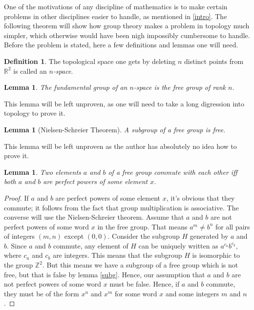 \documentclass[12pt, titlepage]{article}
\newtheorem{lem}[thm]{Lemma}
\theoremstyle{definition}
\newtheorem{defn}{Definition}[section]
\begin{document}
One of the motivations of any discipline of mathematics is to make certain problems in other disciplines easier to handle, as mentioned in \autoref{intro}. The following theorem will show how group theory makes a problem in topology much simpler, which otherwise would have been nigh impossibly cumbersome to handle. Before the problem is stated, here a few definitions and lemmas one will need.

\begin{defn}
The topological space one gets by deleting $n$ distinct points from $\mathbb{R}^2$ is called an \emph{$n$-space}.
\end{defn}

\begin{lem}
The \emph{fundamental group} of an $n$-space is the free group of rank $n$.
\end{lem}

This lemma will be left unproven, as one will need to take a long digression into topology to prove it.

\begin{lem}[Nielsen-Schreier Theorem]\label{subg}
A subgroup of a free group is free.
\end{lem}

This lemma will be left unproven as the author has absolutely no idea how to prove it.

\begin{lem}\label{impo}
Two elements $a$ and $b$ of a free group commute with each other iff both $a$ and $b$ are perfect powers of some element $x$.
\end{lem}

\begin{proof}
If $a$ and $b$ are perfect powers of some element $x$, it's obvious that they commute; it follows from the fact that group multiplication is associative. The converse will use the Nielsen-Schreier theorem. Assume that $a$ and $b$ are not perfect powers of some word $x$ in the free group. That means $a^m \neq b^n$ for all pairs of integers $(m,n)$ except $(0,0)$. Consider the subgroup $H$ generated by $a$ and $b$. Since $a$ and $b$ commute, any element of $H$ can be uniquely written as $a^{c_a}b^{c_b}$, where $c_a$ and $c_b$ are integers. This means that the subgroup $H$ is isomorphic to the group $\mathbb{Z}^2$. But this means we have a subgroup of a free group which is not free, but that is false by lemma \autoref{subg}. Hence, our assumption that $a$ and $b$ are not perfect powers of some word $x$ must be false. Hence, if $a$ and $b$ commute, they must be of the form $x^n$ and $x^m$ for some word $x$ and some integers $m$ and $n$.
\end{proof}
\end{document}
